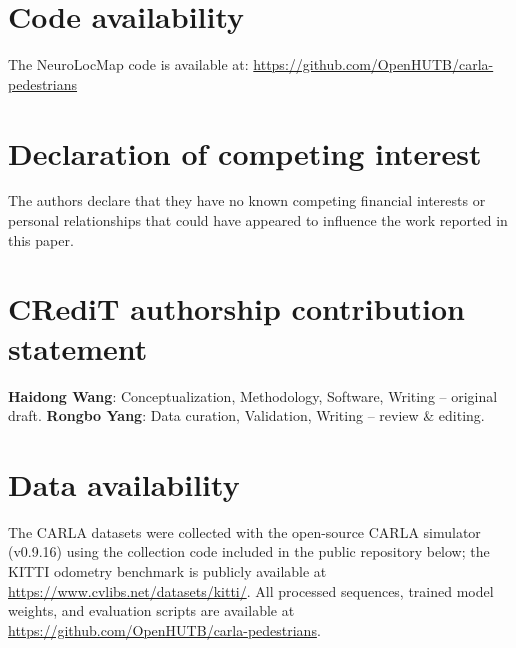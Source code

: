 \documentclass[5p,times]{elsarticle}
\begin{document}
\section*{Code availability}

The NeuroLocMap code is available at: \url{https://github.com/OpenHUTB/carla-pedestrians}

\section*{Declaration of competing interest}

The authors declare that they have no known competing financial interests or personal relationships that could have appeared to influence the work reported in this paper.

\section*{CRediT authorship contribution statement}

\textbf{Haidong Wang}: Conceptualization, Methodology, Software, Writing -- original draft. \textbf{Rongbo Yang}: Data curation, Validation, Writing -- review \& editing.

\section*{Data availability}

The CARLA datasets were collected with the open-source CARLA simulator (v0.9.16) using the collection code included in the public repository below; the KITTI odometry benchmark is publicly available at \url{https://www.cvlibs.net/datasets/kitti/}. All processed sequences, trained model weights, and evaluation scripts are available at \url{https://github.com/OpenHUTB/carla-pedestrians}.



\end{document}
